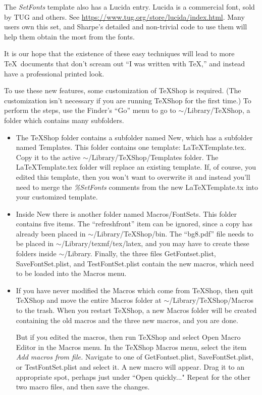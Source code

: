 \documentclass[11pt, oneside]{amsart}
\begin{document}
The {\em SetFonts} template also has a Lucida entry. Lucida is a commercial font, sold by TUG and others. 
See \url{https://www.tug.org/store/lucida/index.html}. Many users own this set, and Sharpe's detailed and non-trivial code to use them will help them obtain the most from the fonts.

It is our hope that the existence of these easy techniques will lead to more \TeX\ documents that don't scream out ``I was written with \TeX,'' and instead have a professional printed look.

To use these new features, some customization of TeXShop is required. (The customization isn't
necessary if you are running TeXShop for the first time.) To perform the steps, use the
Finder's ``Go'' menu to go to $\sim$/Library/TeXShop, a folder which contains many subfolders.
\begin{itemize}
\item The TeXShop folder contains a subfolder named New, which has a subfolder named Templates. This folder contains one template: LaTeXTemplate.tex. Copy it to the
active $\sim$/Library/TeXShop/Templates folder. The LaTeXTemplate.tex folder will replace an existing template. If, of course, you edited this template, then you won't want to overwrite it and instead you'll need to merge the {\em \%SetFonts} comments from the new LaTeXTemplate.tx into your customized template.
\item Inside New there is another folder named Macros/FontSets. This folder contains five items. 
The ``refreshfront'' item can be ignored, since a copy has already been placed in $\sim$/Library/TeXShop/bin. The ``bg8.pdf'' file needs to be placed in $\sim$/Library/texmf/tex/latex, and you may have to create these folders inside $\sim$/Library. Finally, the three files GetFontset.plist, SaveFontSet.plist, and TestFontSet.plist contain the new macros, which need to be loaded into
the Macros menu.
\item If you have never modified the Macros which come from TeXShop, then quit TeXShop and
move the entire Macros folder at $\sim$/Library/TeXShop/Macros to the trash. When you restart TeXShop, a  new Macros folder
will be created containing the old macros and the three new macros, and you are done.

But if you  edited the macros, then run TeXShop and select Open Macro Editor in the Macros menu. In the TeXShop  Macros menu,   select the item {\em Add macros from file.} Navigate to 
one of GetFontset.plist, SaveFontSet.plist, or TestFontSet.plist and select it.  A new macro will appear. Drag it to an appropriate spot, perhaps just under ``Open quickly..." Repeat for the other two macro files, and then save the changes.
\end{itemize}
\end{document}
